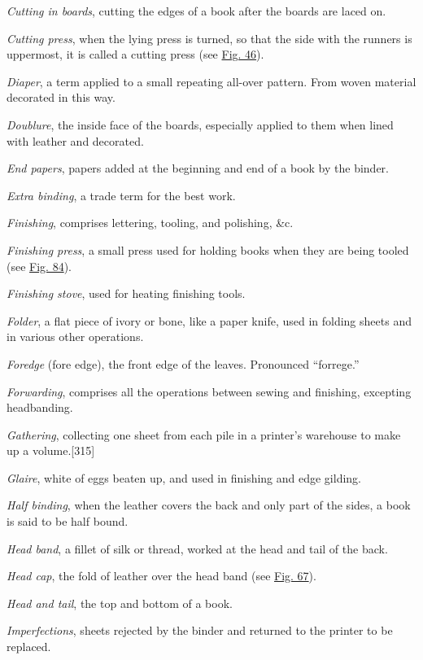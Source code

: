 \documentclass[
]{article}
\begin{document}
\emph{Cutting in boards}, cutting the edges of a book after the boards
are laced on.

\emph{Cutting press}, when the lying press is turned, so that the side
with the runners is uppermost, it is called a cutting press (see
\protect\hyperlink{Fig_46}{Fig. 46}).

\emph{Diaper}, a term applied to a small repeating all-over pattern.
From woven material decorated in this way.

\emph{Doublure}, the inside face of the boards, especially applied to
them when lined with leather and decorated.

\emph{End papers}, papers added at the beginning and end of a book by
the binder.

\emph{Extra binding}, a trade term for the best work.

\emph{Finishing}, comprises lettering, tooling, and polishing, \&c.

\emph{Finishing press}, a small press used for holding books when they
are being tooled (see \protect\hyperlink{Fig_84}{Fig. 84}).

\emph{Finishing stove}, used for heating finishing tools.

\emph{Folder}, a flat piece of ivory or bone, like a paper knife, used
in folding sheets and in various other operations.

\emph{Foredge} (fore edge), the front edge of the leaves. Pronounced
``forrege.''

\emph{Forwarding}, comprises all the operations between sewing and
finishing, excepting headbanding.

\emph{Gathering}, collecting one sheet from each pile in a printer's
warehouse to make up a
volume.{\protect\hypertarget{Page_315}{}{{[}315{]}}}

\emph{Glaire}, white of eggs beaten up, and used in finishing and edge
gilding.

\emph{Half binding}, when the leather covers the back and only part of
the sides, a book is said to be half bound.

\emph{Head band}, a fillet of silk or thread, worked at the head and
tail of the back.

\emph{Head cap}, the fold of leather over the head band (see
\protect\hyperlink{Fig_67}{Fig. 67}).

\emph{Head and tail}, the top and bottom of a book.

\emph{Imperfections}, sheets rejected by the binder and returned to the
printer to be replaced.
\end{document}
